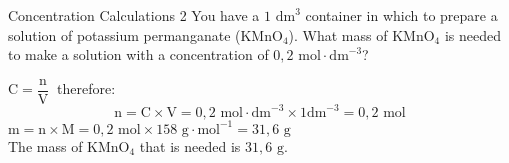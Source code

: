     \noindent
\par


      \begin{wex}{Concentration Calculations 2 }
{
You have a $1 {\text{ dm}}^{3}$ container in which to prepare a solution of potassium permanganate ($\text{KMnO}{}_{4}$). What mass of $\text{KMnO}{}_{4}$ is needed to make a solution with a concentration of $0,2 \text{ mol}\cdot \text{dm}^{-3}$? 
     }
{
$\text{C}=\dfrac{\text{n}}{\text{V}}~$ therefore:
      \label{m38712*id283321}\nopagebreak\noindent{}        
    \begin{equation*}
    \text{n}=\text{C}\ensuremath{\times}\text{V}=0,2 \text{ mol} \cdot \text{dm}^{-3} \times 1 \text{dm}^{-3} = 0,2 \text{ mol}
      \end{equation*}
$\text{m}=\text{n} \times \text{M} = 0,2 \text{ mol} \times 158 \text{ g} \cdot \text{mol}^{-1} = 31,6 \text{ g}$\\
The mass of $\text{KMnO}{}_{4}$ that is needed is $31,6 \text{ g}$.
 
}
    \end{wex}
    \noindent
\label{m38712*secfhsst!!!underscore!!!id1795} 

